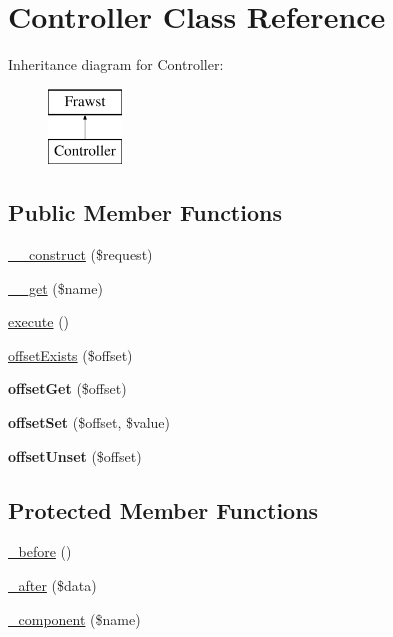 \hypertarget{classController}{
\section{Controller Class Reference}
\label{classController}
}
Inheritance diagram for Controller:\begin{figure}[H]
\begin{center}
\leavevmode
\includegraphics[height=2.000000cm]{classController}
\end{center}
\end{figure}
\subsection*{Public Member Functions}
\begin{DoxyCompactItemize}
\item 
\hyperlink{classController_ab91faf91a99b21a429324499f9ec9f70}{\_\-\_\-construct} (\$request)
\item 
\hyperlink{classController_ae031bdcdd680eafcc1f36f497db0cdcf}{\_\-\_\-get} (\$name)
\item 
\hyperlink{classController_a9f80ff7e29e17e2de1da86a2ccf4141e}{execute} ()
\item 
\hyperlink{classController_afd8b14fbfe9fe316fa4262fb56c80a9b}{offsetExists} (\$offset)
\item 
\hypertarget{classController_a2bb66130679fad3445985ef891756ae6}{
{\bfseries offsetGet} (\$offset)}
\label{classController_a2bb66130679fad3445985ef891756ae6}

\item 
\hypertarget{classController_adaeadaa71308f663d7356d363badd724}{
{\bfseries offsetSet} (\$offset, \$value)}
\label{classController_adaeadaa71308f663d7356d363badd724}

\item 
\hypertarget{classController_a2fbbf76d571682af01e4eb32fcc81ea7}{
{\bfseries offsetUnset} (\$offset)}
\label{classController_a2fbbf76d571682af01e4eb32fcc81ea7}

\end{DoxyCompactItemize}
\subsection*{Protected Member Functions}
\begin{DoxyCompactItemize}
\item 
\hyperlink{classController_ad39427afb53b12d4fc3b037cdd7d01b6}{\_\-before} ()
\item 
\hyperlink{classController_a7f25281d53ef0fed70ae0d687d2cea99}{\_\-after} (\$data)
\item 
\hyperlink{classController_ac425af9dbdb9979417c81a7c07ca6c28}{\_\-component} (\$name)
\end{DoxyCompactItemize}
